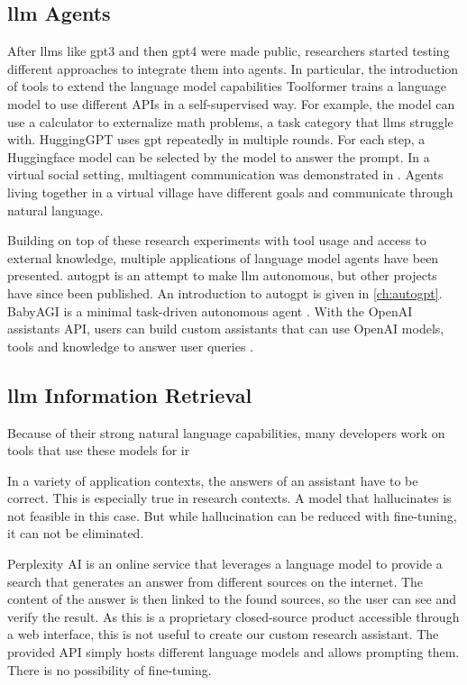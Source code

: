 \documentclass[../main.tex]{subfiles}
\begin{document}
\subsection{\gls{llm} Agents}

After \glspl{llm} like \gls{gpt3} and then \gls{gpt4} were made public,
researchers started testing different approaches to integrate them into agents.
In particular, the introduction of tools to extend the language model capabilities
Toolformer \cite{Schick2023} trains a language model to use different APIs in a self-supervised way.
For example, the model can use a calculator to externalize math problems,
a task category that \glspl{llm} struggle with.
HuggingGPT \cite{Shen2023} uses \gls{gpt} repeatedly in multiple rounds.
For each step, a Huggingface model can be selected by the model to answer the prompt.
In a virtual social setting, multiagent communication was demonstrated in \autocite{Park2023}.
Agents living together in a virtual village have different goals and communicate through natural language.

Building on top of these research experiments with tool usage and access to external knowledge,
multiple applications of language model agents have been presented.
\gls{autogpt} \cite{SignificantGravitas2024} is an attempt to make \gls{llm} autonomous,
but other projects have since been published.
An introduction to \gls{autogpt} is given in \autoref{ch:autogpt}.
BabyAGI is a minimal task-driven autonomous agent \cite{Nakajima2024}.
With the OpenAI assistants API,
users can build custom assistants
that can use OpenAI models, tools and knowledge to answer user queries \cite{zotero-195}.


\subsection{\gls{llm} Information Retrieval}

Because of their strong natural language capabilities,
many developers work on tools that use these models for \gls{ir}

In a variety of application contexts,
the answers of an assistant have to be correct.
This is especially true in research contexts.
A model that hallucinates is not feasible in this case. %
But while hallucination can be reduced with fine-tuning,
it can not be eliminated.

Perplexity AI \cite{zotero-197} is an online service that leverages a language model
to provide a search that generates an answer from different sources on the internet.
The content of the answer is then linked to the found sources,
so the user can see and verify the result.
As this is a proprietary closed-source product accessible through a web interface,
this is not useful to create our custom research assistant.
The provided API simply hosts different language models and allows prompting them.
There is no possibility of fine-tuning.
\end{document}
